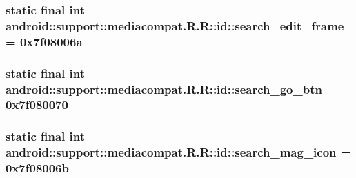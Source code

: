 \hypertarget{classandroid_1_1support_1_1mediacompat_1_1_r_1_1id_49b24c53b2c835b5cdc1a4ee7d724e24}{
\subsubsection[{search\_\-edit\_\-frame}]{\setlength{\rightskip}{0pt plus 5cm}static final int android::support::mediacompat.R.R::id::search\_\-edit\_\-frame = 0x7f08006a}}
\label{classandroid_1_1support_1_1mediacompat_1_1_r_1_1id_49b24c53b2c835b5cdc1a4ee7d724e24}


\hypertarget{classandroid_1_1support_1_1mediacompat_1_1_r_1_1id_e24604ab322d9a129c0ddf40780a182a}{
\subsubsection[{search\_\-go\_\-btn}]{\setlength{\rightskip}{0pt plus 5cm}static final int android::support::mediacompat.R.R::id::search\_\-go\_\-btn = 0x7f080070}}
\label{classandroid_1_1support_1_1mediacompat_1_1_r_1_1id_e24604ab322d9a129c0ddf40780a182a}


\hypertarget{classandroid_1_1support_1_1mediacompat_1_1_r_1_1id_14960c8449a43c2ca1224ed574b1a72f}{
\subsubsection[{search\_\-mag\_\-icon}]{\setlength{\rightskip}{0pt plus 5cm}static final int android::support::mediacompat.R.R::id::search\_\-mag\_\-icon = 0x7f08006b}}
\label{classandroid_1_1support_1_1mediacompat_1_1_r_1_1id_14960c8449a43c2ca1224ed574b1a72f}


